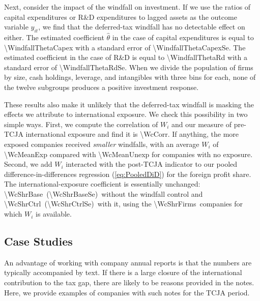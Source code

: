 \documentclass[11pt,letterpaper]{article}
\newcommand{\CountNum}[1]{\num[round-mode=places,round-precision=0]{#1}}
\newcommand{\CoefNum}[1]{\num[round-mode=places,round-precision=3]{#1}}
\newcommand{\SENum}[1]{(\num[round-mode=places,round-precision=3]{#1})}
\begin{document}
Next, consider the impact of the windfall on investment.
If we use the ratios of capital expenditures or R\&D expenditures to lagged
assets as the outcome variable $y_{it}$,
we find that the deferred-tax windfall has no detectable effect on either.
The estimated coefficient $\hat\theta$ in the case of capital expenditures is equal to
\CoefNum{\WindfallThetaCapex}
with a standard error of 
\CoefNum{\WindfallThetaCapexSe}.
The estimated coefficient in the case of R\&D is equal to
\CoefNum{\WindfallThetaRd}
with a standard error of 
\CoefNum{\WindfallThetaRdSe}.
When we divide the population of firms by size, cash holdings,
leverage, and intangibles with three bins for each, none of the twelve subgroups produces a
positive investment response.


These results also make it unlikely that the deferred-tax windfall is masking
the effects we attribute to international exposure.
We check this possibility in two simple ways. First, we compute the correlation
of $W_i$ and our measure of pre-TCJA international exposure and find it
is \CoefNum{\WcCorr}. 
If anything, the more exposed companies received \emph{smaller}
windfalls, with an average $W_i$ of \CoefNum{\WcMeanExp} compared with
\CoefNum{\WcMeanUnexp} for companies with no exposure.
Second, we add $W_i$ interacted with the post-TCJA indicator to our pooled
difference-in-differences regression (\ref{eq:PooledDiD}) for the foreign profit share.
The international-exposure coefficient is essentially unchanged:
\CoefNum{\WcShrBase}\ \SENum{\WcShrBaseSe}\ without the windfall control and
\CoefNum{\WcShrCtrl}\ \SENum{\WcShrCtrlSe}\ with it, using the
\CountNum{\WcShrFirms}\ companies for which $W_i$ is available.



\subsection{Case Studies\label{sec:Cases}}

An advantage of working with company annual reports 
is that the numbers are typically accompanied by text.
If there is a large closure of the international contribution
to the tax gap, there are likely to be reasons provided
in the notes. Here, we provide examples of companies
with such notes for the TCJA period.
\end{document}
